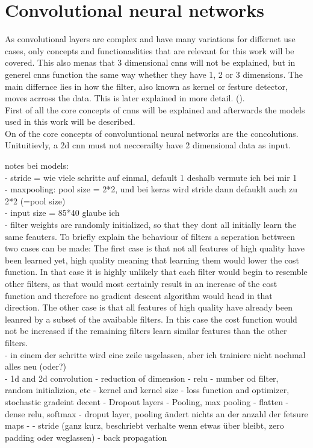 \chapter{Convolutional neural networks}
As convolutional layers are complex and have many variations for differnet use cases, only concepts and functionaslities that are relevant for this work will be covered. This also menas that 3 dimensional cnns will not be explained, but in generel cnns function the same way whether they have 1, 2 or 3 dimensions. The main differnce lies in how the filter, also known as kernel or festure detector, moves acrross the data. This is later explained in more detail. (). \\
 First of all the core concepts of cnns will be explained and afterwards the models used in this work will be described.\\

On of the core concepts of convoluntional neural networks are the concolutions. \\




Unituitievly, a 2d cnn must not neccerailty have 2 dimensional data as input.

notes bei models:\\
- stride = wie viele schritte auf einmal, default 1 deshalb vermute ich bei mir 1\\
- maxpooling: pool size = 2*2, und bei keras wird stride dann defauklt auch zu 2*2 (=pool size)\\
- input size = 85*40 glaube ich\\
- filter weights are randomly initialized, so that they dont all initially learn the same feauters. To briefly explain the behaviour of filters a seperation bettween two cases can be made: The first case is that not all features of high quality have been learned yet, high quality meaning that learning them would lower the cost function. In that case it is highly unlikely that each filter would begin to resemble other filters, as that would most certainly result in an increase of the cost function and therefore no gradient descent algorithm would head in that direction. The other case is that all features of high quality have already been leanred by a subset of the avaibable filters. In this case the cost function would not be increased if the remaining filters learn similar features than the other filters. \\
- in einem der schritte wird eine zeile usgelassen, aber ich trainiere nicht nochmal alles neu (oder?)\\

- 1d and 2d convolution
- reduction of dimension
- relu 
- number od filter, random initializion, etc
- kernel and kernel size
- loss function and optimizer, stochastic gradeint decent
- Dropout layers
- Pooling, max pooling 
- flatten
- dense relu, softmax
- droput layer, pooling ändert nichts an der anzahl der fetsure maps
- 
- stride (ganz kurz, beschriebt verhalte wenn etwas über bleibt, zero padding oder weglassen)
- back propagation

  


